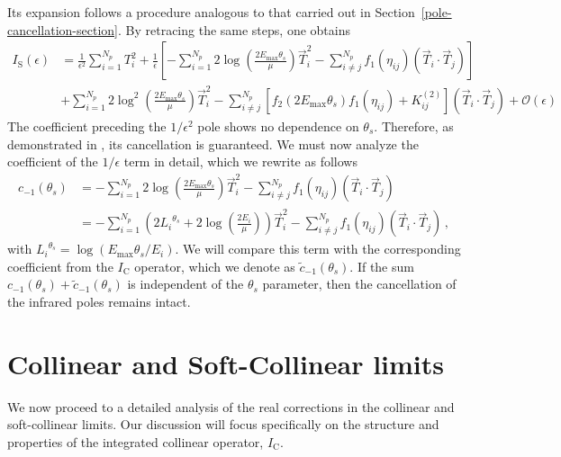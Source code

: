 \documentclass[a4paper, 12pt]{book}
\begin{document}
Its expansion follows a procedure analogous to that carried out in Section~\ref{pole-cancellation-section}. By retracing the same steps, one obtains
\begin{equation}
  \begin{aligned}
  I_{\mathrm{S}} (\epsilon) &= \frac{1}{\epsilon^2} \sum_{i=1}^{N_p} T_i^2 + \frac{1}{\epsilon}\left[-\sum_{i=1}^{N_p} 2 \log{\left(\frac{2 E_{\mathrm{max}}\theta_s}{\mu} \right)} \vec{T}_i^2 - \sum_{i\neq j}^{N_p} f_1(\eta_{ij}) (\vec{T}_i \cdot \vec{T}_j) \right]  \\
  &  + \sum_{i=1}^{N_p} 2 \log^2{\left(\frac{2 E_{\mathrm{max}}\theta_s}{\mu} \right)}\vec{T}_i^2 - \sum_{i\neq j}^{N_p} \left[ f_2 \left(2 E_{\mathrm{max}}\theta_s\right) f_1(\eta_{ij}) + K_{ij}^{(2)}\right] (\vec{T}_i \cdot \vec{T}_j) + \mathcal{O}(\epsilon)
  \end{aligned}
\end{equation}
The coefficient preceding the $1/\epsilon^2$ pole shows no dependence on $\theta_s$. Therefore, as demonstrated in \cite{Devoto:2023rpv}, its cancellation is guaranteed. We must now analyze the coefficient of the $1/\epsilon$ term in detail, which we rewrite as follows
\begin{equation}
  \begin{aligned}
  c_{-1}(\theta_s) & = -\sum_{i=1}^{N_p} 2 \log{\left(\frac{2 E_{\mathrm{max}}\theta_s}{\mu} \right)} \vec{T}_i^2 - \sum_{i\neq j}^{N_p} f_1(\eta_{ij}) (\vec{T}_i \cdot \vec{T}_j)  \\
  & = -\sum_{i=1}^{N_p} \left( 2{L_i}^{\theta_s} + 2 \log{\left(\frac{2 E_i}{\mu} \right) } \right) \vec{T}_i^2 - \sum_{i\neq j}^{N_p} f_1(\eta_{ij}) (\vec{T}_i \cdot \vec{T}_j) \, ,
  \label{coefficient-soft}
  \end{aligned}
\end{equation}
with ${L_i}^{\theta_s}=\log{\left(E_{\mathrm{max}}\theta_s/E_i\right)}$. We will compare this term with the corresponding coefficient from the $I_{\mathrm{C}}$ operator, which we denote as $\tilde{c}_{-1}(\theta_s)$. If the sum $c_{-1}(\theta_s) + \tilde{c}_{-1}(\theta_s)$ is independent of the $\theta_s$ parameter, then the cancellation of the infrared poles remains intact.

\section{Collinear and Soft-Collinear limits}
We now proceed to a detailed analysis of the real corrections in the collinear and soft-collinear limits. Our discussion will focus specifically on the structure and properties of the integrated collinear operator, $I_{\mathrm{C}}$.
\end{document}
